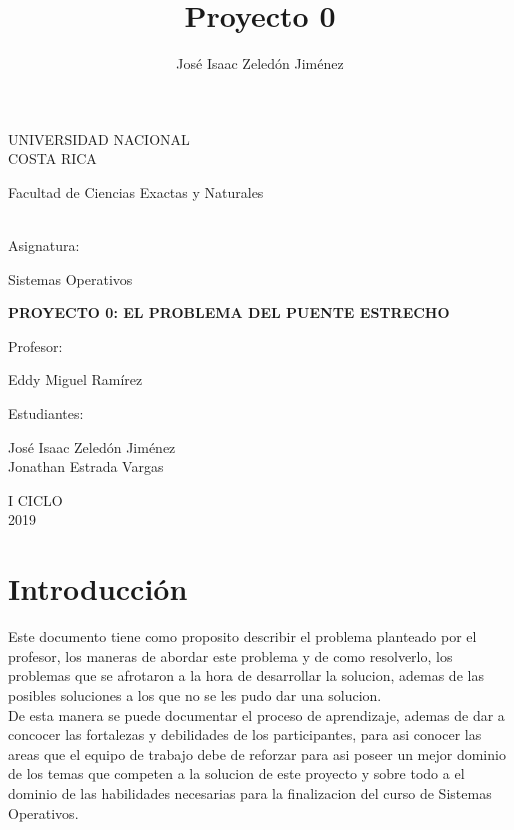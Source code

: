 \documentclass[10pt,a4paper]{article}
\author{José Isaac Zeledón Jiménez }
\title{Proyecto 0}
\begin{document}
\begin{titlepage}
\begin{center}
\begin{large}
UNIVERSIDAD NACIONAL\\
COSTA RICA \\
\end{large}
\vspace*{1cm}
\begin{large}
Facultad de Ciencias Exactas y Naturales
\end{large} 
\vspace*{1.8cm}\\
Asignatura:\\
\vspace*{2mm}
\begin{large}
Sistemas Operativos\\
\end{large}
\vspace*{12mm}
\begin{large}
\textbf{PROYECTO 0: 
EL PROBLEMA DEL PUENTE ESTRECHO
}\\
\end{large}
\vspace*{1.8cm}
Profesor:\\
\vspace*{5mm}
\begin{large}
Eddy Miguel Ramírez\\
\end{large}
\vspace*{1.8cm}
Estudiantes: \\
\vspace*{5mm}
\begin{large}
José Isaac Zeledón Jiménez\\
Jonathan Estrada Vargas\\
\end{large}
\vspace*{1.8cm}
I CICLO\\
\vspace*{1.8cm}
2019
\end{center}
\end{titlepage}
\section{Introducción}
	Este documento tiene como proposito describir el problema planteado por el profesor, los maneras de abordar este problema y de como resolverlo, los problemas que se afrotaron a la hora de desarrollar la solucion, ademas de las posibles soluciones a los que no se les pudo dar una solucion.\\
De esta manera se puede documentar el proceso de aprendizaje, ademas de dar a concocer las fortalezas y debilidades de los participantes, para asi conocer las areas que el equipo de trabajo debe de reforzar para asi poseer un mejor dominio de los temas que competen a la solucion de este proyecto y sobre todo a el dominio de las habilidades necesarias para la finalizacion del curso de Sistemas Operativos.\\
\end{document}
